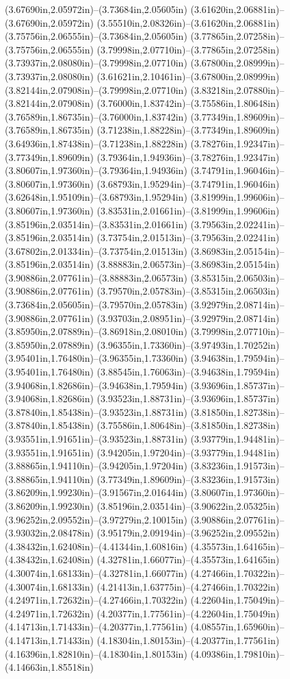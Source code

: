 (3.67690in,2.05972in)--(3.73684in,2.05605in) (3.61620in,2.06881in)--(3.67690in,2.05972in) (3.55510in,2.08326in)--(3.61620in,2.06881in) (3.75756in,2.06555in)--(3.73684in,2.05605in) (3.77865in,2.07258in)--(3.75756in,2.06555in) (3.79998in,2.07710in)--(3.77865in,2.07258in) (3.73937in,2.08080in)--(3.79998in,2.07710in) (3.67800in,2.08999in)--(3.73937in,2.08080in) (3.61621in,2.10461in)--(3.67800in,2.08999in) (3.82144in,2.07908in)--(3.79998in,2.07710in) (3.83218in,2.07880in)--(3.82144in,2.07908in) (3.76000in,1.83742in)--(3.75586in,1.80648in) (3.76589in,1.86735in)--(3.76000in,1.83742in) (3.77349in,1.89609in)--(3.76589in,1.86735in) (3.71238in,1.88228in)--(3.77349in,1.89609in) (3.64936in,1.87438in)--(3.71238in,1.88228in) (3.78276in,1.92347in)--(3.77349in,1.89609in) (3.79364in,1.94936in)--(3.78276in,1.92347in) (3.80607in,1.97360in)--(3.79364in,1.94936in) (3.74791in,1.96046in)--(3.80607in,1.97360in) (3.68793in,1.95294in)--(3.74791in,1.96046in) (3.62648in,1.95109in)--(3.68793in,1.95294in) (3.81999in,1.99606in)--(3.80607in,1.97360in) (3.83531in,2.01661in)--(3.81999in,1.99606in) (3.85196in,2.03514in)--(3.83531in,2.01661in) (3.79563in,2.02241in)--(3.85196in,2.03514in) (3.73754in,2.01513in)--(3.79563in,2.02241in) (3.67802in,2.01334in)--(3.73754in,2.01513in) (3.86983in,2.05154in)--(3.85196in,2.03514in) (3.88883in,2.06573in)--(3.86983in,2.05154in) (3.90886in,2.07761in)--(3.88883in,2.06573in) (3.85315in,2.06503in)--(3.90886in,2.07761in) (3.79570in,2.05783in)--(3.85315in,2.06503in) (3.73684in,2.05605in)--(3.79570in,2.05783in) (3.92979in,2.08714in)--(3.90886in,2.07761in) (3.93703in,2.08951in)--(3.92979in,2.08714in) (3.85950in,2.07889in)--(3.86918in,2.08010in) (3.79998in,2.07710in)--(3.85950in,2.07889in) (3.96355in,1.73360in)--(3.97493in,1.70252in) (3.95401in,1.76480in)--(3.96355in,1.73360in) (3.94638in,1.79594in)--(3.95401in,1.76480in) (3.88545in,1.76063in)--(3.94638in,1.79594in) (3.94068in,1.82686in)--(3.94638in,1.79594in) (3.93696in,1.85737in)--(3.94068in,1.82686in) (3.93523in,1.88731in)--(3.93696in,1.85737in) (3.87840in,1.85438in)--(3.93523in,1.88731in) (3.81850in,1.82738in)--(3.87840in,1.85438in) (3.75586in,1.80648in)--(3.81850in,1.82738in) (3.93551in,1.91651in)--(3.93523in,1.88731in) (3.93779in,1.94481in)--(3.93551in,1.91651in) (3.94205in,1.97204in)--(3.93779in,1.94481in) (3.88865in,1.94110in)--(3.94205in,1.97204in) (3.83236in,1.91573in)--(3.88865in,1.94110in) (3.77349in,1.89609in)--(3.83236in,1.91573in) (3.86209in,1.99230in)--(3.91567in,2.01644in) (3.80607in,1.97360in)--(3.86209in,1.99230in) (3.85196in,2.03514in)--(3.90622in,2.05325in) (3.96252in,2.09552in)--(3.97279in,2.10015in) (3.90886in,2.07761in)--(3.93032in,2.08478in) (3.95179in,2.09194in)--(3.96252in,2.09552in) (4.38432in,1.62408in)--(4.41344in,1.60816in) (4.35573in,1.64165in)--(4.38432in,1.62408in) (4.32781in,1.66077in)--(4.35573in,1.64165in) (4.30074in,1.68133in)--(4.32781in,1.66077in) (4.27466in,1.70322in)--(4.30074in,1.68133in) (4.21413in,1.63775in)--(4.27466in,1.70322in) (4.24971in,1.72632in)--(4.27466in,1.70322in) (4.22604in,1.75049in)--(4.24971in,1.72632in) (4.20377in,1.77561in)--(4.22604in,1.75049in) (4.14713in,1.71433in)--(4.20377in,1.77561in) (4.08557in,1.65960in)--(4.14713in,1.71433in) (4.18304in,1.80153in)--(4.20377in,1.77561in) (4.16396in,1.82810in)--(4.18304in,1.80153in) (4.09386in,1.79810in)--(4.14663in,1.85518in) 
